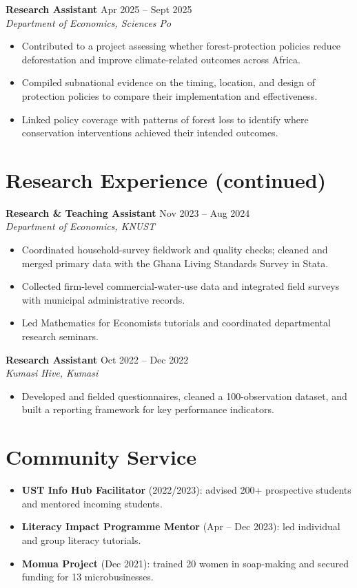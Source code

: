 \documentclass[11pt,a4paper]{article}
\newcommand{\role}[3]{%
  \textbf{#1} \hfill #2\\[-1pt]
  \textit{#3}\par\vspace{0.45ex}
}
\begin{document}
\role{Research Assistant}{Apr 2025 -- Sept 2025}{Department of Economics, Sciences Po}
\begin{itemize}
  \item Contributed to a project assessing whether forest-protection policies reduce deforestation and improve climate-related outcomes across Africa.
  \item Compiled subnational evidence on the timing, location, and design of protection policies to compare their implementation and effectiveness.
  \item Linked policy coverage with patterns of forest loss to identify where conservation interventions achieved their intended outcomes.
\end{itemize}

\newpage
\section*{Research Experience (continued)}
\role{Research \& Teaching Assistant}{Nov 2023 -- Aug 2024}{Department of Economics, KNUST}
\begin{itemize}
  \item Coordinated household-survey fieldwork and quality checks; cleaned and merged primary data with the Ghana Living Standards Survey in Stata.
  \item Collected firm-level commercial-water-use data and integrated field surveys with municipal administrative records.
  \item Led Mathematics for Economists tutorials and coordinated departmental research seminars.
\end{itemize}

\role{Research Assistant}{Oct 2022 -- Dec 2022}{Kumasi Hive, Kumasi}
\begin{itemize}
  \item Developed and fielded questionnaires, cleaned a 100-observation dataset, and built a reporting framework for key performance indicators.
\end{itemize}

\section*{Community Service}
\begin{itemize}
  \item \textbf{UST Info Hub Facilitator} (2022/2023): advised 200+ prospective students and mentored incoming students.
  \item \textbf{Literacy Impact Programme Mentor} (Apr -- Dec 2023): led individual and group literacy tutorials.
  \item \textbf{Momua Project} (Dec 2021): trained 20 women in soap-making and secured funding for 13 microbusinesses.
\end{itemize}
\end{document}
